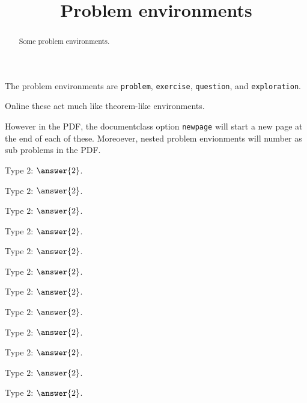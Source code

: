 \documentclass{ximera}
\title{Problem environments}
\begin{document}
\begin{abstract}
  Some problem environments.
\end{abstract}
\maketitle

The problem environments are \verb|problem|, \verb|exercise|, \verb|question|, and \verb|exploration|.

Online these act much like theorem-like environments.

However in the PDF, the documentclass option \verb|newpage| will start
a new page at the end of each of these. Moreoever, nested problem
envionments will number as sub problems in the PDF.

\begin{exercise}
  Type $2$: $\answer{2}$.
\end{exercise}

\begin{exercise}
  Type $2$: $\answer{2}$.
  \begin{exercise}
  Type $2$: $\answer{2}$.
  \end{exercise}
\end{exercise}


\begin{problem}
  Type $2$: $\answer{2}$.
\end{problem}

\begin{problem}
  Type $2$: $\answer{2}$.
  \begin{problem}
  Type $2$: $\answer{2}$.
  \end{problem}
\end{problem}


\begin{question}
  Type $2$: $\answer{2}$.
\end{question}

\begin{question}
  Type $2$: $\answer{2}$.
  \begin{question}
  Type $2$: $\answer{2}$.
  \end{question}
\end{question}



\begin{exploration}
  Type $2$: $\answer{2}$.
\end{exploration}

\begin{exploration}
  Type $2$: $\answer{2}$.
  \begin{exploration}
  Type $2$: $\answer{2}$.
  \end{exploration}
\end{exploration}
\end{document}
